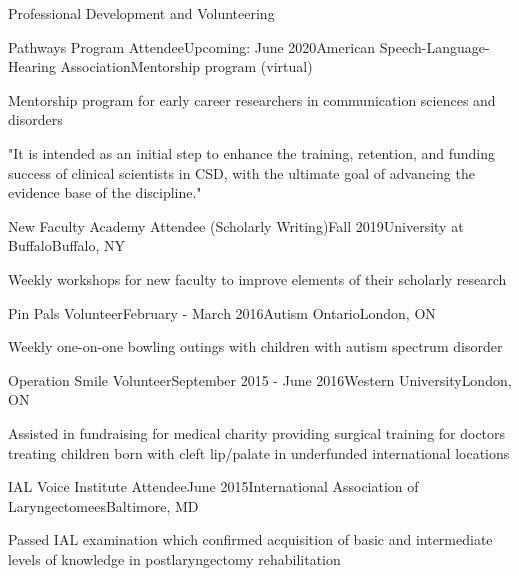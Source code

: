 \documentclass{resume} %
\begin{document}
\begin{rSection}{Professional Development and Volunteering}

	\begin{rSubsection}{Pathways Program Attendee}{Upcoming: June 2020}{American Speech-Language-Hearing Association}{Mentorship program (virtual)}
		\item Mentorship program for early career researchers in communication sciences and disorders
		\item "It is intended as an initial step to enhance the training, retention, and funding success of clinical scientists in CSD, with the ultimate goal of advancing the evidence base of the discipline."
	\end{rSubsection}

	\begin{rSubsection}{New Faculty Academy Attendee (Scholarly Writing)}{Fall 2019}{University at Buffalo}{Buffalo, NY}
		\item Weekly workshops for new faculty to improve elements of their scholarly research
	\end{rSubsection}


	\begin{rSubsection}{Pin Pals Volunteer}{February - March 2016}{Autism Ontario}{London, ON}
	\item Weekly one-on-one bowling outings with children with autism spectrum disorder
	
	\end{rSubsection}
	
	
	\begin{rSubsection}{Operation Smile Volunteer}{September 2015 - June 2016}{Western University}{London, ON}
	\item Assisted in fundraising for medical charity providing surgical training for doctors treating children born with cleft lip/palate in underfunded international locations
	
	\end{rSubsection}
	
	
	\begin{rSubsection}{IAL Voice Institute Attendee}{June 2015}{International Association of Laryngectomees}{Baltimore, MD}
	\item Passed IAL examination which confirmed acquisition of basic and intermediate levels of knowledge in postlaryngectomy rehabilitation
	

\end{rSubsection}
\end{rSection}
\end{document}
